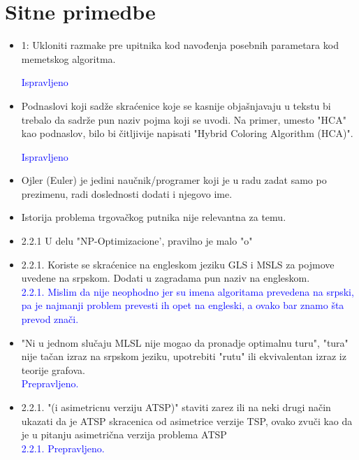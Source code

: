 \documentclass[a4paper]{report}
\newcommand{\odgovor}[1]{\textcolor{blue}{#1}}
\begin{document}
\section{Sitne primedbe}
\begin{itemize}
    \item 1: Ukloniti razmake pre upitnika kod navođenja posebnih parametara kod memetskog algoritma.
    
    \odgovor{Ispravljeno}
    
    \item Podnaslovi koji sadže skraćenice koje se kasnije objašnjavaju u tekstu bi trebalo da sadrže pun naziv pojma koji se uvodi. Na primer, umesto "HCA" kao podnaslov, bilo bi čitljivije napisati "Hybrid Coloring Algorithm (HCA)".
    
    
    \odgovor{Ispravljeno}
    \item Ojler (Euler) je jedini naučnik/programer koji je u radu zadat samo po prezimenu, radi doslednosti dodati i njegovo ime.
    \item Istorija problema trgovačkog putnika nije relevantna za temu.
    \item 2.2.1 U delu "NP-Optimizacione', pravilno je malo "o"
    \item 2.2.1. Koriste se skraćenice na engleskom jeziku GLS i MSLS za pojmove uvedene na srpskom. Dodati u zagradama pun naziv na engleskom. \\
    \odgovor{ 2.2.1. Mislim da nije neophodno jer su imena algoritama prevedena na srpski, pa je najmanji problem prevesti ih opet na engleski, a ovako bar znamo šta prevod znači.} 
    
    \item "Ni u jednom slučaju MLSL nije mogao da pronadje optimalnu turu", "tura" nije tačan izraz na srpskom jeziku, upotrebiti "rutu" ili ekvivalentan izraz iz teorije grafova.\\
    \odgovor{ Prepravljeno.}
    
    \item 2.2.1. "(i asimetricnu verziju ATSP)" staviti zarez ili na neki drugi način ukazati da je ATSP skracenica od asimetrice verzije TSP, ovako zvuči kao da je u pitanju asimetrična verzija problema ATSP \\
 \odgovor{ 2.2.1.  Prepravljeno. \\}
    
   
\end{itemize}
\end{document}
